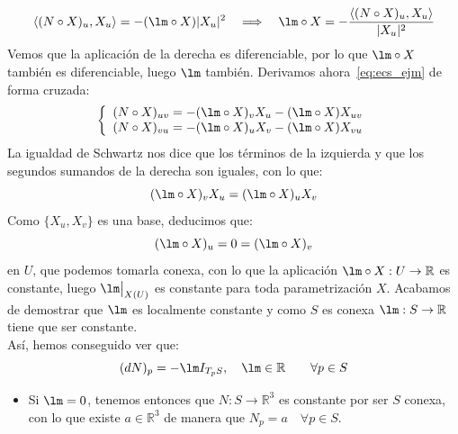 \begin{ejercicio}
    \begin{equation*}
        \langle (N\circ X)_u,X_u \rangle = -(\lm\circ X)|X_u|^2 \quad\Longrightarrow\quad \lm\circ X = -\frac{\langle (N\circ X)_u,X_u \rangle }{|X_u|^2}
    \end{equation*}
    Vemos que la aplicación de la derecha es diferenciable, por lo que $\lm\circ X$ también es diferenciable, luego $\lm$ también. Derivamos ahora~\eqref{eq:ecs_ejm} de forma cruzada:
    \begin{equation*}
        \left\{\begin{array}{l}
            (N\circ X)_{uv} = -(\lm\circ X)_vX_u - (\lm\circ X)X_{uv} \\
            (N\circ X)_{vu} = -(\lm\circ X)_uX_v - (\lm\circ X)X_{vu}
        \end{array}\right.
    \end{equation*}
    La igualdad de Schwartz nos dice que los términos de la izquierda y que los segundos sumandos de la derecha son iguales, con lo que:
    \begin{equation*}
        (\lm\circ X)_v X_u = (\lm\circ X)_u X_v
    \end{equation*}
    Como $\{X_u,X_v\}$ es una base, deducimos que:
    \begin{equation*}
        (\lm\circ X)_u = 0 = (\lm\circ X)_v 
    \end{equation*}
    en $U$, que podemos tomarla conexa, con lo que la aplicación $\lm\circ X:U\to\mathbb{R}$ es constante, luego $\lm\big|_{X(U)}$ es constante para toda parametrización $X$. Acabamos de demostrar que $\lm$ es localmente constante y como $S$ es conexa $\lm:S\to\mathbb{R}$ tiene que ser constante.\\

    \noindent
    Así, hemos conseguido ver que:
    \begin{equation*}
        (dN)_p = -\lm I_{T_pS}, \quad \lm\in \mathbb{R} \qquad \forall p\in S
    \end{equation*}
    \begin{itemize}
        \item Si $\lm = 0$, tenemos entonces que $N:S\to\mathbb{R}^3$ es constante por ser $S$ conexa, con lo que existe $a\in \mathbb{R}^3$ de manera que $N_p = a \quad \forall p\in S$.


\end{itemize}
\end{ejercicio}
